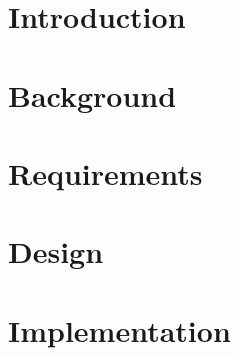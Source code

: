 \documentclass{l4proj}
\begin{document}
%
%
%
%
%
%
%
%

\chapter{Introduction}


\chapter{Background}


\chapter{Requirements}


\chapter{Design}


\chapter{Implementation}

\end{document}
